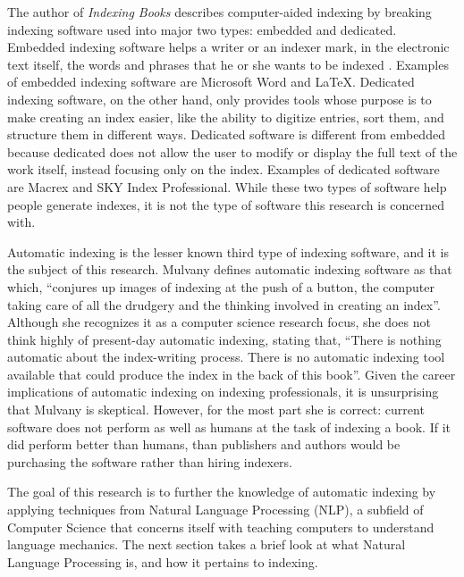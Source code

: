 The author of {\it Indexing Books} describes computer-aided indexing by breaking indexing software used into major two types: embedded and dedicated.
Embedded indexing software helps a writer or an indexer mark, in the electronic text itself, the words and phrases that he or she wants to be indexed \cite{mulvany}.
Examples of embedded indexing software are Microsoft Word \cite{ms-word-indexing} and \LaTeX \cite{lamport}.
Dedicated indexing software, on the other hand, only provides tools whose purpose is to make creating an index easier, like the ability to digitize entries, sort them, and structure them in different ways\cite{mulvany}.
Dedicated software is different from embedded because dedicated does not allow the user to modify or display the full text of the work itself, instead focusing only on the index.
Examples of dedicated software are Macrex\cite{macrex} and SKY Index Professional\cite{sky-software}.
While these two types of software help people generate indexes, it is not the type of software this research is concerned with.

Automatic indexing is the lesser known third type of indexing software, and it is the subject of this research.
Mulvany defines automatic indexing software as that which, ``conjures up images of indexing at the push of a button, the computer taking care of all the drudgery and the thinking involved in creating an index''\cite{mulvany}.
Although she recognizes it as a computer science research focus, she does not think highly of present-day automatic indexing, stating that, ``There is nothing automatic about the index-writing process.
There is no automatic indexing tool available that could produce the index in the back of this book''\cite{mulvany}.
Given the career implications of automatic indexing on indexing professionals, it is unsurprising that Mulvany is skeptical.
However, for the most part she is correct: current software does not perform as well as humans at the task of indexing a book.
If it did perform better than humans, than publishers and authors would be purchasing the software rather than hiring indexers.

The goal of this research is to further the knowledge of automatic indexing by applying techniques from Natural Language Processing (NLP), a subfield of Computer Science that concerns itself with teaching computers to understand language mechanics.
The next section takes a brief look at what Natural Language Processing is, and how it pertains to indexing.




